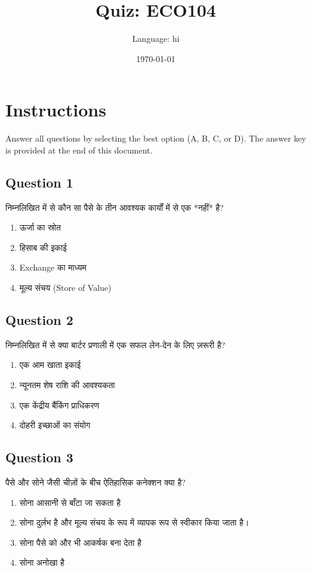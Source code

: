 \documentclass[12pt,a4paper]{article}
\title{Quiz: ECO104}
\author{Language: hi}
\date{\today}
\begin{document}
\maketitle
\thispagestyle{fancy}

\section*{Instructions}
Answer all questions by selecting the best option (A, B, C, or D). The answer key is provided at the end of this document.

\bigskip


\subsection*{Question 1}
निम्नलिखित में से कौन सा पैसे के तीन आवश्यक कार्यों में से एक *नहीं* है?

\begin{enumerate}[label=\Alph*., leftmargin=*]
\item ऊर्जा का स्रोत
\item हिसाब की इकाई
\item Exchange का माध्यम
\item मूल्य संचय (Store of Value)
\end{enumerate}

\bigskip


\subsection*{Question 2}
निम्नलिखित में से क्या बार्टर प्रणाली में एक सफल लेन-देन के लिए ज़रूरी है?

\begin{enumerate}[label=\Alph*., leftmargin=*]
\item एक आम खाता इकाई
\item न्यूनतम शेष राशि की आवश्यकता
\item एक केंद्रीय बैंकिंग प्राधिकरण
\item दोहरी इच्छाओं का संयोग
\end{enumerate}

\bigskip


\subsection*{Question 3}
पैसे और सोने जैसी चीज़ों के बीच ऐतिहासिक कनेक्शन क्या है?

\begin{enumerate}[label=\Alph*., leftmargin=*]
\item सोना आसानी से बाँटा जा सकता है
\item सोना दुर्लभ है और मूल्य संचय के रूप में व्यापक रूप से स्वीकार किया जाता है।
\item सोना पैसे को और भी आकर्षक बना देता है
\item सोना अनोखा है
\end{enumerate}
\end{document}
